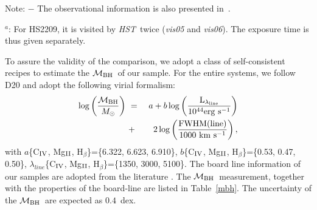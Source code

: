 \documentclass[fleqn,usenatbib]{mnras}
\newcommand{\hst}{{\it HST}}
\newcommand{\mbh}{$\mathcal M_{\rm BH}$}
\newcommand{\Hb}{H$_{\beta}$}
\newcommand{\Mgii}{Mg$_{\rm II}$}
\newcommand{\Civ}{C$_{\rm IV}$}
\begin{document}
\begin{table}
\centering
\caption{Summary of lensed AGN observational details.}\label{data_set}
\begin{tablenotes}
      \small
      \item Note: $-$ The observational information is also presented in~\citet{Ding2017a}. 
      \item $^a$: For HS2209, it is visited by \hst\ twice ({\it vis05} and {\it vis06}). The exposure time is thus given separately.
\end{tablenotes}  
\end{table}

To assure the validity of the comparison, we adopt a class of self-consistent recipes to estimate the \mbh\ of our sample. For the entire systems, we follow D20 and adopt the following virial formalism:
\begin{eqnarray}
\label{recipe}
\log \left(\frac{\mathcal M_{\rm BH}}{M_{\odot}}\right)&~=~& a+b \log \left(\frac{ \rm L _{\lambda_{line}}}{10^{44}{\rm erg~s^{-1}}}\right) \nonumber\\
&~+~& 2 \log \left(\frac{\rm FWHM(line)}{1000 ~{\rm km~s^{-1}}}\right) , 
\end {eqnarray}
%
with $a$\{\Civ, \Mgii, \Hb\}=\{6.322, 6.623, 6.910\},
$b$\{\Civ, \Mgii, \Hb\}=\{0.53, 0.47, 0.50\},
$\lambda_{line}$\{\Civ, \Mgii, \Hb\}=\{1350, 3000, 5100\}.
%
The board line information of our samples are adopted from the literature \citep{Sluse2012, Peng2006, Shen2011}. The \mbh\ measurement, together with the properties of the board-line are listed in Table~\ref{mbh}. The uncertainty of the \mbh\ are expected as $0.4$~dex.
\end{document}
